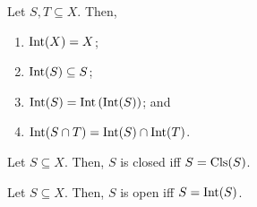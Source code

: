 \begin{thm}
Let $S,T\subseteq X$.  Then,
\begin{enumerate}
\item $\operatorname{Int} (X)=X$;
\item $\operatorname{Int} (S)\subseteq S$;
\item $\operatorname{Int} (S)=\operatorname{Int} \left( \operatorname{Int} (S)\right)$; and
\item $\operatorname{Int} (S\cap T)=\operatorname{Int} (S)\cap \operatorname{Int} (T)$.
\end{enumerate}
\end{thm}
\begin{prp}\label{prp4.2.21}
Let $S\subseteq X$.  Then, $S$ is closed iff $S=\operatorname{Cls} (S)$.
\end{prp}
\begin{prp}
Let $S\subseteq X$.  Then, $S$ is open iff $S=\operatorname{Int} (S)$.
\end{prp}

